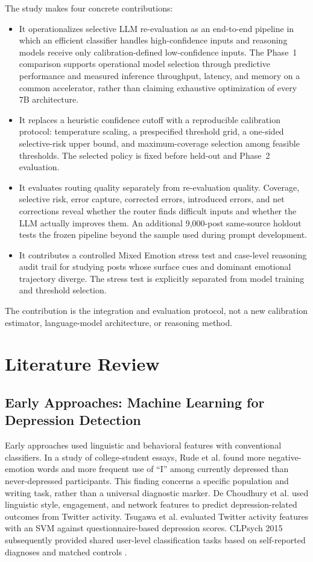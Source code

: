 \documentclass{ieeeaccess}
\begin{document}
The study makes four concrete contributions:
\begin{itemize}
\item It operationalizes selective LLM re-evaluation as an end-to-end pipeline in which an efficient classifier handles high-confidence inputs and reasoning models receive only calibration-defined low-confidence inputs. The Phase~1 comparison supports operational model selection through predictive performance and measured inference throughput, latency, and memory on a common accelerator, rather than claiming exhaustive optimization of every 7B architecture.
\item It replaces a heuristic confidence cutoff with a reproducible calibration protocol: temperature scaling, a prespecified threshold grid, a one-sided selective-risk upper bound, and maximum-coverage selection among feasible thresholds. The selected policy is fixed before held-out and Phase~2 evaluation.
\item It evaluates routing quality separately from re-evaluation quality. Coverage, selective risk, error capture, corrected errors, introduced errors, and net corrections reveal whether the router finds difficult inputs and whether the LLM actually improves them. An additional 9,000-post same-source holdout tests the frozen pipeline beyond the sample used during prompt development.
\item It contributes a controlled Mixed Emotion stress test and case-level reasoning audit trail for studying posts whose surface cues and dominant emotional trajectory diverge. The stress test is explicitly separated from model training and threshold selection.
\end{itemize}

The contribution is the integration and evaluation protocol, not a new calibration estimator, language-model architecture, or reasoning method.

\section{Literature Review}

\subsection{Early Approaches: Machine Learning for Depression Detection}

Early approaches used linguistic and behavioral features with conventional classifiers. In a study of college-student essays, Rude et al. \cite{ref20} found more negative-emotion words and more frequent use of ``I'' among currently depressed than never-depressed participants. This finding concerns a specific population and writing task, rather than a universal diagnostic marker. De Choudhury et al. \cite{ref21} used linguistic style, engagement, and network features to predict depression-related outcomes from Twitter activity. Tsugawa et al. \cite{ref22} evaluated Twitter activity features with an SVM against questionnaire-based depression scores. CLPsych 2015 subsequently provided shared user-level classification tasks based on self-reported diagnoses and matched controls \cite{ref23}.
\end{document}
